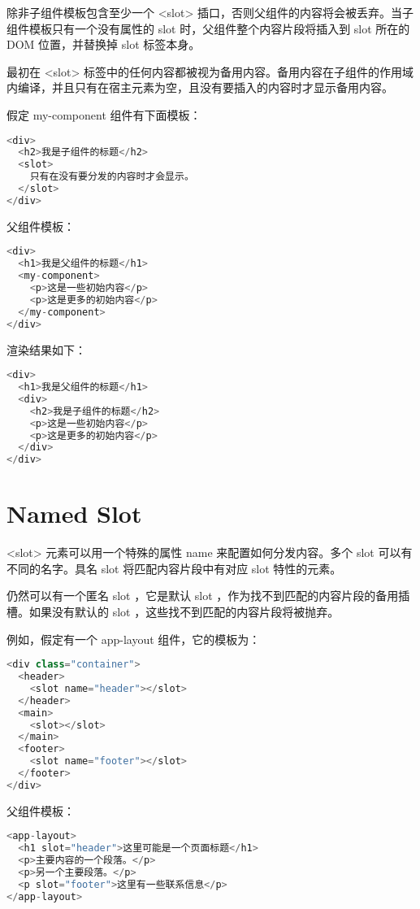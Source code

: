 除非子组件模板包含至少一个 <slot> 插口，否则父组件的内容将会被丢弃。当子组件模板只有一个没有属性的 slot 时，父组件整个内容片段将插入到 slot 所在的 DOM 位置，并替换掉 slot 标签本身。

最初在 <slot> 标签中的任何内容都被视为备用内容。备用内容在子组件的作用域内编译，并且只有在宿主元素为空，且没有要插入的内容时才显示备用内容。

假定 my-component 组件有下面模板：

\begin{lstlisting}[language=JavaScript]
<div>
  <h2>我是子组件的标题</h2>
  <slot>
    只有在没有要分发的内容时才会显示。
  </slot>
</div>
\end{lstlisting}


父组件模板：


\begin{lstlisting}[language=JavaScript]
<div>
  <h1>我是父组件的标题</h1>
  <my-component>
    <p>这是一些初始内容</p>
    <p>这是更多的初始内容</p>
  </my-component>
</div>
\end{lstlisting}


渲染结果如下：


\begin{lstlisting}[language=JavaScript]
<div>
  <h1>我是父组件的标题</h1>
  <div>
    <h2>我是子组件的标题</h2>
    <p>这是一些初始内容</p>
    <p>这是更多的初始内容</p>
  </div>
</div>
\end{lstlisting}


\section{Named Slot}

<slot> 元素可以用一个特殊的属性 name 来配置如何分发内容。多个 slot 可以有不同的名字。具名 slot 将匹配内容片段中有对应 slot 特性的元素。

仍然可以有一个匿名 slot ，它是默认 slot ，作为找不到匹配的内容片段的备用插槽。如果没有默认的 slot ，这些找不到匹配的内容片段将被抛弃。

例如，假定有一个 app-layout 组件，它的模板为：

\begin{lstlisting}[language=JavaScript]
<div class="container">
  <header>
    <slot name="header"></slot>
  </header>
  <main>
    <slot></slot>
  </main>
  <footer>
    <slot name="footer"></slot>
  </footer>
</div>
\end{lstlisting}


父组件模板：


\begin{lstlisting}[language=JavaScript]
<app-layout>
  <h1 slot="header">这里可能是一个页面标题</h1>
  <p>主要内容的一个段落。</p>
  <p>另一个主要段落。</p>
  <p slot="footer">这里有一些联系信息</p>
</app-layout>
\end{lstlisting}


